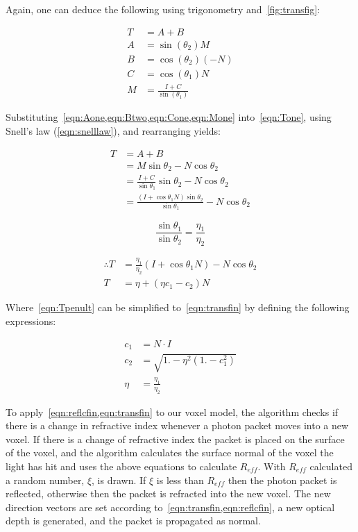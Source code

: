 \begin{appendices}
Again, one can deduce the following using trigonometry and~\cref{fig:transfig}:

\begin{align}
T&=A+B\label{eqn:Tone}\\
A&=\sin\left(\theta_2\right) M\label{eqn:Aone}\\
B&=\cos\left(\theta_2\right)(-N)\label{eqn:Btwo}\\
C&=\cos\left(\theta_1\right)N\label{eqn:Cone}\\
M&=\frac{I+C}{\sin\left(\theta_1\right)}\label{eqn:Mone}
\end{align}

Substituting~\cref{eqn:Aone,eqn:Btwo,eqn:Cone,eqn:Mone} into~\cref{eqn:Tone}, using Snell's law (\cref{eqn:snelllaw}), and rearranging yields:

\begin{align}
T&=A+B\\
&=M\sin\theta_2-N\cos\theta_2\\
&=\frac{I+C}{\sin\theta_1}\sin\theta_2-N\cos\theta_2\\
&=\frac{(I+\cos\theta_1 N)\sin\theta_2}{\sin\theta_1}-N\cos\theta_2
\end{align}

\begin{equation}
\frac{\sin\theta_1}{\sin\theta_2}=\frac{\eta_1}{\eta_2}\label{eqn:snelllaw}
\end{equation}

\begin{align}
\therefore T&=\frac{\eta_1}{\eta_2}\left(I+\cos\theta_1 N\right)-N\cos\theta_2\label{eqn:Tpenult}\\
T&=\eta+\left(\eta c_1-c_2\right)N\label{eqn:transfin}
\end{align}

Where~\cref{eqn:Tpenult} can be simplified to~\cref{eqn:transfin} by defining the following expressions:

\begin{align}
c_1 &= N \cdot I\label{eqn:c1}\\
c_2 &= \sqrt{1. - \eta^2 (1. - c_1^2)}\label{eqn:c2}\\
\eta&=\frac{\eta_1}{\eta_2}
\end{align}


To apply~\cref{eqn:reflcfin,eqn:transfin} to our voxel model, the algorithm checks if there is a change in refractive index whenever a photon packet moves into a new voxel.
If there is a change of refractive index the packet is placed on the surface of the voxel, and the algorithm calculates the surface normal of the voxel the light has hit and uses the above equations to calculate $R_{eff}$.
With $R_{eff}$ calculated a random number, $\xi$, is drawn.
If $\xi$ is less than $R_{eff}$ then the photon packet is reflected, otherwise then the packet is refracted into the new voxel.
The new direction vectors are set according to~\cref{eqn:transfin,eqn:reflcfin}, a new optical depth is generated, and the packet is propagated as normal.


\end{appendices}
